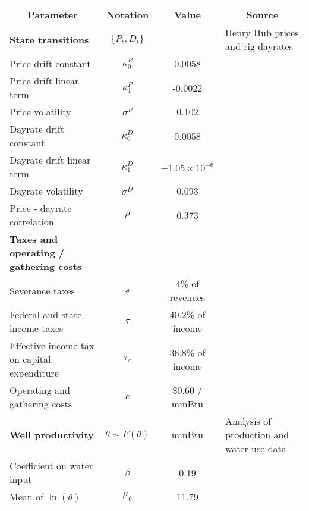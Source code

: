 \begin{tabular} {l c c l } \midrule \midrule 
\multicolumn{1}{c}{\textbf{Parameter}} & \textbf{Notation} & \textbf{Value} & \multicolumn{1}{c}{\textbf{Source}} \\ 
\midrule 
\textbf{State transitions} & $\{P_t, D_t\}$ & & Henry Hub prices and rig dayrates \\ 
\hspace{4pt} Price drift constant & $\kappa^P_0$ &   0.0058 &  \\ 
\hspace{4pt} Price drift linear term & $\kappa^P_1$ &  -0.0022 &  \\ 
\hspace{4pt} Price volatility & $\sigma^P$ &    0.102 &  \\ 
\hspace{4pt} Dayrate drift constant & $\kappa^D_0$ &   0.0058 &  \\ 
\hspace{4pt} Dayrate drift linear term & $\kappa^D_1$ & $-1.05 \times 10^{-6}$  &  \\ 
\hspace{4pt} Dayrate volatility & $\sigma^D$ &    0.093 &  \\ 
\hspace{4pt} Price - dayrate correlation & $\rho$ &    0.373 &  \\ 
\midrule 
\textbf{Taxes and operating / gathering costs} &  & & \citet{bib:gulen} \\ 
\hspace{4pt} Severance taxes & $s$ & 4\% of revenues & \\ 
\hspace{4pt} Federal and state income taxes & $\tau$ &     40.2\% of income & \\ 
\hspace{4pt} Effective income tax on capital expenditure & $\tau_c$ &     36.8\% of income & \\ 
\hspace{4pt} Operating and gathering costs & $c$ & $\$     0.60 $ / mmBtu & \\ 
\midrule \midrule 
\textbf{Well productivity} & $\theta \sim F(\theta)$ & mmBtu & Analysis of production and water use data  \\ 
\hspace{4pt} Coefficient on water input & $\beta$ &     0.19 & \\ 
\hspace{4pt} Mean of $\ln(\theta)$ & $\mu_{\theta}$ &    11.79 & \\ 

\end{tabular}
